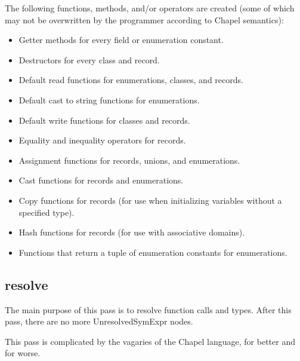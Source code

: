 \documentclass[10pt]{article}
\begin{document}
The following functions, methods, and/or operators are created (some
of which may not be overwritten by the programmer according to Chapel
semantics):
\begin{itemize}
\item Getter methods for every field or enumeration constant.
\item Destructors for every class and record.
\item Default read functions for enumerations, classes, and records.
\item Default cast to string functions for enumerations.
\item Default write functions for classes and records.
\item Equality and inequality operators for records.
\item Assignment functions for records, unions, and enumerations.
\item Cast functions for records and enumerations.
\item Copy functions for records (for use when initializing variables
  without a specified type).
\item Hash functions for records (for use with associative domains).
\item Functions that return a tuple of enumeration constants for
  enumerations.
\end{itemize}

\subsection{resolve}

The main purpose of this pass is to resolve function calls and types.
After this pass, there are no more UnresolvedSymExpr nodes.

This pass is complicated by the vagaries of the Chapel language, for
better and for worse.
\end{document}

